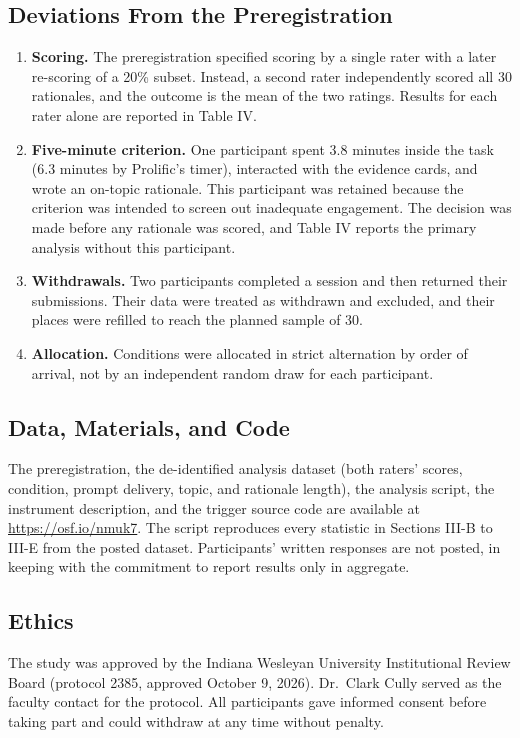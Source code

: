 \documentclass[12pt,letterpaper]{article}
\begin{document}
\subsection{Deviations From the Preregistration}
\begin{enumerate}
\item \textbf{Scoring.} The preregistration specified scoring by a single rater with a later re-scoring of a 20\% subset. Instead, a second rater independently scored all 30 rationales, and the outcome is the mean of the two ratings. Results for each rater alone are reported in Table IV.
\item \textbf{Five-minute criterion.} One participant spent 3.8 minutes inside the task (6.3 minutes by Prolific's timer), interacted with the evidence cards, and wrote an on-topic rationale. This participant was retained because the criterion was intended to screen out inadequate engagement. The decision was made before any rationale was scored, and Table IV reports the primary analysis without this participant.
\item \textbf{Withdrawals.} Two participants completed a session and then returned their submissions. Their data were treated as withdrawn and excluded, and their places were refilled to reach the planned sample of 30.
\item \textbf{Allocation.} Conditions were allocated in strict alternation by order of arrival, not by an independent random draw for each participant.
\end{enumerate}

\subsection{Data, Materials, and Code}
The preregistration, the de-identified analysis dataset (both raters' scores, condition, prompt delivery, topic, and rationale length), the analysis script, the instrument description, and the trigger source code are available at \url{https://osf.io/nmuk7}. The script reproduces every statistic in Sections III-B to III-E from the posted dataset. Participants' written responses are not posted, in keeping with the commitment to report results only in aggregate.

\subsection{Ethics}
The study was approved by the Indiana Wesleyan University Institutional Review Board (protocol 2385, approved October 9, 2026). Dr.\ Clark Cully served as the faculty contact for the protocol. All participants gave informed consent before taking part and could withdraw at any time without penalty.
\end{document}

